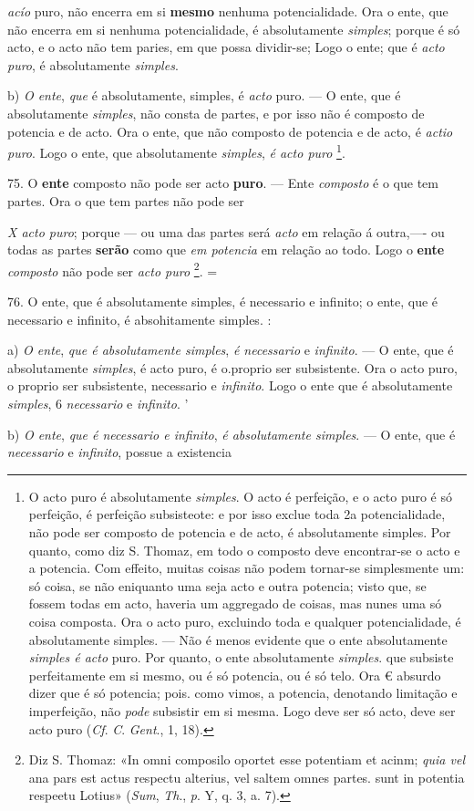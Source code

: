  \emph{acío} puro, não encerra em si \textbf{mesmo} nenhuma potencialidade. Ora o ente, que não encerra em si nenhuma potencialidade, é absolutamente \emph{simples}; porque é só acto, e o acto não tem paries, em que possa dividir-se; Logo o ente; que é \emph{acto puro}, é absolutamente \emph{simples}.

b) \emph{O ente}, \emph{que} é absolutamente, simples, é \emph{acto} puro. --- O ente, que é absolutamente \emph{simples}, não consta de partes, e por isso não é composto de potencia e de acto. Ora o ente, que não composto de potencia e de acto, é \emph{actio puro}. Logo o ente, que absolutamente \emph{simples}, \emph{é acto puro} \footnote{O acto puro é absolutamente \emph{simples}. O acto é perfeição, e o acto puro é só perfeição, é perfeição subsisteote: e por isso exclue toda 2a potencialidade, não pode ser composto de potencia e de acto, é absolutamente \textbar{} simples. Por quanto, como diz S. Thomaz, em todo o composto deve encontrar-se o acto e a potencia. Com effeito, muitas coisas não podem tornar-se simplesmente um: só coisa, se não eniquanto uma seja acto e outra potencia; visto que, se fossem todas em acto, haveria um aggregado de coisas, mas nunes uma só coisa composta. Ora o acto puro, excluindo toda e qualquer potencialidade, é absolutamente simples. --- Não é menos evidente que o ente absolutamente \emph{simples é acto} puro. Por quanto, o ente absolutamente \emph{simples}. que subsiste perfeitamente em si mesmo, ou é só potencia, ou é só telo. Ora € absurdo dizer que é só potencia; pois. como vimos, a potencia, denotando limitação e imperfeição, não \emph{pode} subsistir em si mesma. Logo deve ser só acto, deve ser acto puro (\emph{Cf}. \emph{C}. \emph{Gent}., 1, 18).}.

75. O \textbf{ente} composto não pode ser acto \textbf{puro}. --- Ente \emph{composto} é o que tem partes. Ora o que tem partes não pode ser

\emph{X acto puro}; porque --- ou uma das partes será \emph{acto} em relação á outra,---- ou todas as partes \textbf{serão} como que \emph{em potencia} em relação ao todo. Logo o \textbf{ente} \emph{composto} não pode ser \emph{acto puro} \footnote{Diz S. Thomaz: «In omni composilo oportet esse potentiam et acinm; \emph{quia vel} ana pars est actus respectu alterius, vel saltem omnes partes. sunt in potentia respeetu Lotius» (\emph{Sum}, \emph{Th}., \emph{p}. Y, q. 3, a. 7).}. =

76. O ente, que é absolutamente simples, é necessario e infinito; o ente, que é necessario e infinito, é absohitamente simples. :

a) \emph{O ente}, \emph{que é absolutamente simples}, \emph{é necessario} e \emph{infinito}. --- O ente, que é absolutamente \emph{simples}, é acto puro, é o.proprio ser subsistente. Ora o acto puro, o proprio ser subsistente, necessario e \emph{infinito}. Logo o ente que é absolutamente \emph{simples}, \textbar{} 6 \emph{necessario} e \emph{infinito}. '

b) \emph{O ente}, \emph{que é necessario e infinito}, \emph{é absolutamente simples}. --- O ente, que é \emph{necessario} e \emph{infinito}, possue a existencia 